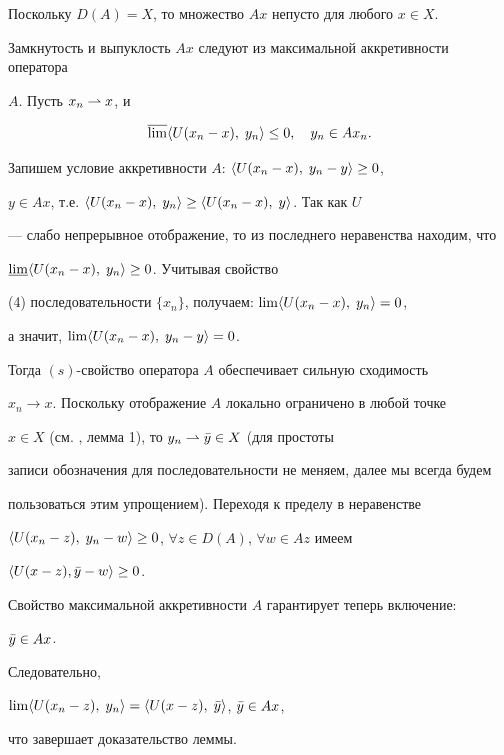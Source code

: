 \begin{pf} Поскольку $D(A)=X$, то множество $Ax$ непусто для любого $x\in X$. 


Замкнутость и выпуклость $Ax$ следуют из максимальной аккретивности оператора 


$A$. Пусть $x_n\rightharpoonup x$, и 


\begin{equation} 


\overline{\lim}\la U(x_n-x),\;y_n\ra \le 0,\quad y_n\in Ax_n. 


\end{equation} 


Запишем условие аккретивности $A$: $\langle U(x_n-x),\;y_n-y\rangle\ge 0$, 


$y\in Ax$, т.е. $\langle U(x_n-x),\;y_n\rangle\ge\langle U(x_n-x),\;y\rangle$. Так как $U$ 


--- слабо непрерывное отображение, то из последнего неравенства находим, что 


$\underline{\lim}\langle U(x_n-x),\;y_n\rangle\ge 0$. Учитывая свойство 


(4) последовательности $\{x_n\}$, получаем: $\lim\langle U(x_n-x),\;y_n\rangle=0$, 


а значит, $\lim\langle U(x_n-x),\;y_n-y\rangle =0$. 


Тогда $(s)$-свойство оператора $A$ обеспечивает сильную сходимость 


$x_n\to x$. Поскольку отображение $A$ локально ограничено в любой точке 


$x\in X$ (см. \cite{Rya1}, лемма 1), то $y_n\rightharpoonup\Bar y\in X$ (для простоты 


записи обозначения для последовательности не меняем, далее мы всегда будем 


пользоваться этим упрощением). Переходя к пределу в неравенстве 


$\langle U(x_n-z),\;y_n-w\rangle\ge 0$, $\forall z\in D(A)$, $\forall w\in Az$ имеем 


$\langle U(x-z),\Bar y-w\rangle\ge 0$.


Свойство максимальной аккретивности $A$ гарантирует теперь включение: 


$\Bar y\in Ax$. 


Следовательно, 


$\lim\langle U(x_n-z),\;y_n\rangle =\langle U(x-z),\;\Bar y\rangle$, $\Bar y\in Ax$, 


что завершает доказательство леммы. 


\end{pf} 


